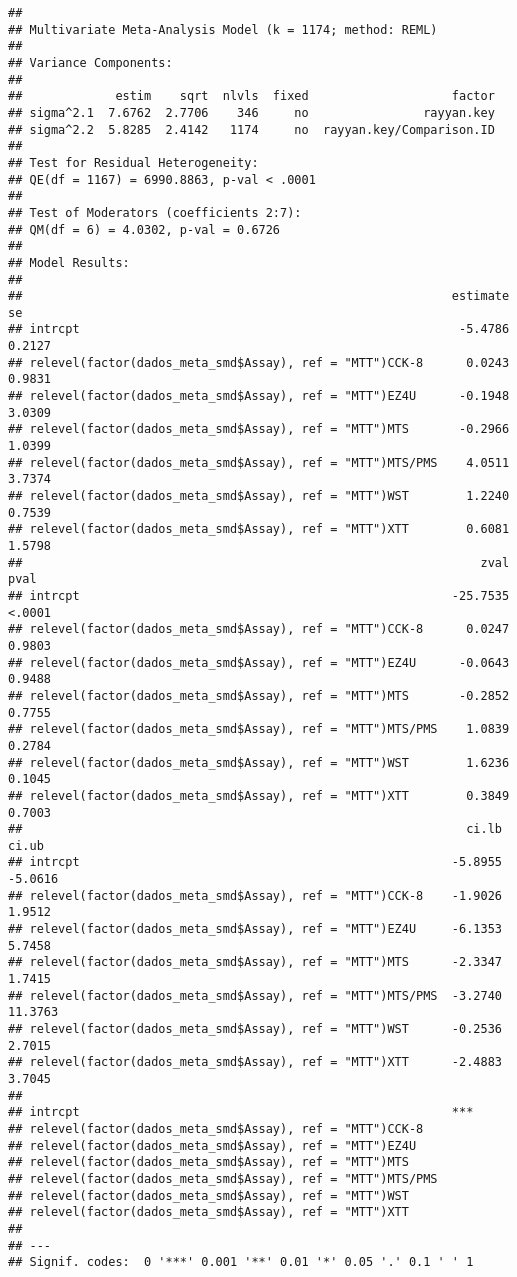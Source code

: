 \documentclass[
]{article}
\begin{document}
\begin{verbatim}
## 
## Multivariate Meta-Analysis Model (k = 1174; method: REML)
## 
## Variance Components:
## 
##             estim    sqrt  nlvls  fixed                    factor 
## sigma^2.1  7.6762  2.7706    346     no                rayyan.key 
## sigma^2.2  5.8285  2.4142   1174     no  rayyan.key/Comparison.ID 
## 
## Test for Residual Heterogeneity:
## QE(df = 1167) = 6990.8863, p-val < .0001
## 
## Test of Moderators (coefficients 2:7):
## QM(df = 6) = 4.0302, p-val = 0.6726
## 
## Model Results:
## 
##                                                            estimate      se 
## intrcpt                                                     -5.4786  0.2127 
## relevel(factor(dados_meta_smd$Assay), ref = "MTT")CCK-8      0.0243  0.9831 
## relevel(factor(dados_meta_smd$Assay), ref = "MTT")EZ4U      -0.1948  3.0309 
## relevel(factor(dados_meta_smd$Assay), ref = "MTT")MTS       -0.2966  1.0399 
## relevel(factor(dados_meta_smd$Assay), ref = "MTT")MTS/PMS    4.0511  3.7374 
## relevel(factor(dados_meta_smd$Assay), ref = "MTT")WST        1.2240  0.7539 
## relevel(factor(dados_meta_smd$Assay), ref = "MTT")XTT        0.6081  1.5798 
##                                                                zval    pval 
## intrcpt                                                    -25.7535  <.0001 
## relevel(factor(dados_meta_smd$Assay), ref = "MTT")CCK-8      0.0247  0.9803 
## relevel(factor(dados_meta_smd$Assay), ref = "MTT")EZ4U      -0.0643  0.9488 
## relevel(factor(dados_meta_smd$Assay), ref = "MTT")MTS       -0.2852  0.7755 
## relevel(factor(dados_meta_smd$Assay), ref = "MTT")MTS/PMS    1.0839  0.2784 
## relevel(factor(dados_meta_smd$Assay), ref = "MTT")WST        1.6236  0.1045 
## relevel(factor(dados_meta_smd$Assay), ref = "MTT")XTT        0.3849  0.7003 
##                                                              ci.lb    ci.ub 
## intrcpt                                                    -5.8955  -5.0616 
## relevel(factor(dados_meta_smd$Assay), ref = "MTT")CCK-8    -1.9026   1.9512 
## relevel(factor(dados_meta_smd$Assay), ref = "MTT")EZ4U     -6.1353   5.7458 
## relevel(factor(dados_meta_smd$Assay), ref = "MTT")MTS      -2.3347   1.7415 
## relevel(factor(dados_meta_smd$Assay), ref = "MTT")MTS/PMS  -3.2740  11.3763 
## relevel(factor(dados_meta_smd$Assay), ref = "MTT")WST      -0.2536   2.7015 
## relevel(factor(dados_meta_smd$Assay), ref = "MTT")XTT      -2.4883   3.7045 
##                                                                
## intrcpt                                                    *** 
## relevel(factor(dados_meta_smd$Assay), ref = "MTT")CCK-8        
## relevel(factor(dados_meta_smd$Assay), ref = "MTT")EZ4U         
## relevel(factor(dados_meta_smd$Assay), ref = "MTT")MTS          
## relevel(factor(dados_meta_smd$Assay), ref = "MTT")MTS/PMS      
## relevel(factor(dados_meta_smd$Assay), ref = "MTT")WST          
## relevel(factor(dados_meta_smd$Assay), ref = "MTT")XTT          
## 
## ---
## Signif. codes:  0 '***' 0.001 '**' 0.01 '*' 0.05 '.' 0.1 ' ' 1
\end{verbatim}
\end{document}
